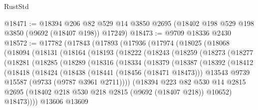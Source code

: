 \begin{lexlean}{RustStd}
\begin{coremodule}
@18471 := @18394
    @206
    @82
    @529
    @14
    @3850
    @2695
    (@18402 @198 @529 @198 @3850 (@9692 (@18407 @198)) @17249)
@18473 := @9709 @18336 @2430
@18572 := @17782
    (@17843
      (@17893
        (@17936
          (@17974
            (@18025
              (@18068
                (@18094
                  (@18131
                    (@18164
                      (@18193
                        (@18222
                          (@18243
                            (@18259
                              (@18273
                                (@18277
                                  (@18281
                                    (@18285
                                      (@18289
                                        (@18316
                                          (@18334
                                            (@18379
                                              (@18387
                                                (@18392
                                                  (@18412
                                                    (@18418
                                                      (@18424
                                                        (@18438
                                                          (@18441 (@18456 (@18471 @18473)))
                                                          @13543
                                                          @9739
                                                          @15587
                                                          (@9733 (@9787 @3961 @2711))))
                                                      (@18394
                                                        @223
                                                        @82
                                                        @530
                                                        @14
                                                        @2815
                                                        @2695
                                                        (@18402
                                                          @218
                                                          @530
                                                          @218
                                                          @2815
                                                          (@9692 (@18407 @218))
                                                          @10652)
                                                        @18473))))
                                                @13606
                                                @13609

\end{coremodule}
\end{lexlean}
